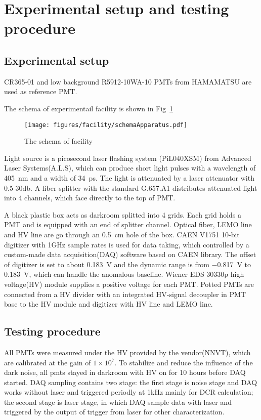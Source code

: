 \section{Experimental setup and testing procedure}
\label{SetUp}
\subsection{Experimental setup}
CR365-01\cite{BJBS} and low background R5912-10WA-10\cite{JPBS} PMTs from HAMAMATSU are used as reference PMT.

The schema of experimentail facility is shown in Fig~\ref{fig:facility}

\begin{figure}[!htbp]
    \centering
    \texttt{[image: figures/facility/schemaApparatus.pdf]}
    \caption{The schema of facility}
    \label{fig:facility}
\end{figure}

Light source is a picosecond laser flashing system (PiL040XSM) from Advanced Laser Systems(A.L.S)\cite{NTKLaser}, which can produce short light pulses with a wavelength of \SI{405}{nm} and a width of \SI{34}{ps}. The light is attenuated by a laser attenuator with 0.5-30db. A fiber splitter with the standard G.657.A1 distributes attenuated light into 4 channels, which face directly to the top of PMT.

A black plastic box acts as darkroom splitted into 4 grids. Each grid holds a PMT and is equipped with an end of splitter channel. Optical fiber, LEMO line and HV line are go through an \SI{0.5}{cm} hole of the box. CAEN V1751 10-bit digitizer with 1GHz sample rates is used for data taking\cite{CAENV1751}, which controlled by a custom-made data acquisition(DAQ) software based on CAEN library. The offset of digitizer is set to about \SI{0.183}{V} and the dynamic range is from \SI{-0.817}{V} to \SI{0.183}{V}, which can handle the anomalous baseline. Wiener EDS 30330p high voltage(HV) module\cite{WIENERHV} supplies a positive voltage for each PMT. Potted PMTs are connected from a HV divider with an integrated HV-signal decoupler in PMT base to the HV module and digitizer with HV line and LEMO line.


\subsection{Testing procedure}
All PMTs were measured under the HV provided by the vendor(NNVT), which are calibrated at the gain of $1\times10^7$. To stabilize and reduce the influence of the dark noise, all pmts stayed in darkroom  with HV on for 10 hours before DAQ started. DAQ sampling contains two stage: the first stage is noise stage and DAQ works without laser and triggered periodly at 1kHz mainly for DCR calculation; the second stage is laser stage, in which DAQ sample data with laser and triggered by the output of trigger from laser for other characterization.